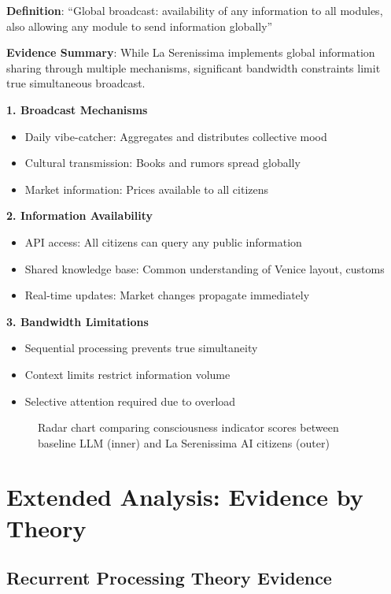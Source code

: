 \textbf{Definition}: ``Global broadcast: availability of any information to all modules, also allowing any module to send information globally''

\textbf{Evidence Summary}: While La Serenissima implements global information sharing through multiple mechanisms, significant bandwidth constraints limit true simultaneous broadcast.

\textbf{1. Broadcast Mechanisms}
\begin{itemize}
    \item Daily vibe-catcher: Aggregates and distributes collective mood
    \item Cultural transmission: Books and rumors spread globally
    \item Market information: Prices available to all citizens
\end{itemize}

\textbf{2. Information Availability}
\begin{itemize}
    \item API access: All citizens can query any public information
    \item Shared knowledge base: Common understanding of Venice layout, customs
    \item Real-time updates: Market changes propagate immediately
\end{itemize}

\textbf{3. Bandwidth Limitations}
\begin{itemize}
    \item Sequential processing prevents true simultaneity
    \item Context limits restrict information volume
    \item Selective attention required due to overload
\end{itemize}

\begin{figure}[H]
\centering
\caption{Radar chart comparing consciousness indicator scores between baseline LLM (inner) and La Serenissima AI citizens (outer)}
\label{fig:radar}
\end{figure}

\section{Extended Analysis: Evidence by Theory}

\subsection{Recurrent Processing Theory Evidence}


